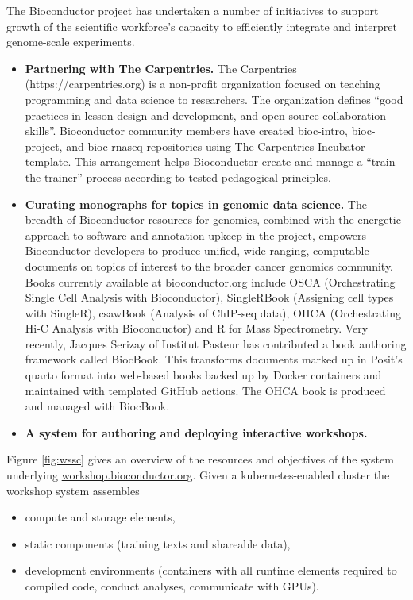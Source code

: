 \documentclass[graybox]{svmult}
\begin{document}
The Bioconductor project has undertaken a number
of initiatives to support growth of the
scientific workforce's capacity to efficiently
integrate and interpret
genome-scale experiments.

\begin{itemize}
\item
  \textbf{Partnering with The Carpentries.} The Carpentries (https://carpentries.org) is a non-profit organization focused on teaching programming
  and data science to researchers. The organization defines ``good
  practices in lesson design and development, and open source
  collaboration skills''. Bioconductor community members have
  created bioc-intro, bioc-project, and bioc-rnaseq repositories
  using The Carpentries Incubator template. This arrangement helps
  Bioconductor create and manage a ``train the trainer'' process
  according to tested pedagogical principles.
\item
  \textbf{Curating monographs for topics in genomic data science.} The
  breadth of Bioconductor resources for genomics, combined with the
  energetic approach to software and annotation upkeep in the project,
  empowers Bioconductor developers to produce unified, wide-ranging,
  computable documents on topics of interest to the broader
  cancer genomics community. Books currently available
  at bioconductor.org include OSCA (Orchestrating Single Cell Analysis
  with Bioconductor), SingleRBook (Assigning cell types with SingleR),
  csawBook (Analysis of ChIP-seq data), OHCA (Orchestrating Hi-C
  Analysis with Bioconductor) and R for Mass Spectrometry. Very
  recently, Jacques Serizay of Institut Pasteur has contributed
  a book authoring framework called BiocBook. This transforms documents
  marked up in Posit's quarto format into web-based books backed up by Docker
  containers and maintained with templated GitHub actions. The
  OHCA book is produced and managed with BiocBook.
\item
  \textbf{A system for authoring and deploying interactive workshops.}
\end{itemize}

Figure \ref{fig:wssc} gives an overview of the resources and
objectives of the system underlying \url{workshop.bioconductor.org}.
Given a kubernetes-enabled cluster
the workshop system assembles

\begin{itemize}
\tightlist
\item
  compute and storage elements,
\item
  static components (training texts and shareable data),
\item
  development environments (containers with all runtime elements
  required to compiled code, conduct analyses, communicate with GPUs).
\end{itemize}
\end{document}
